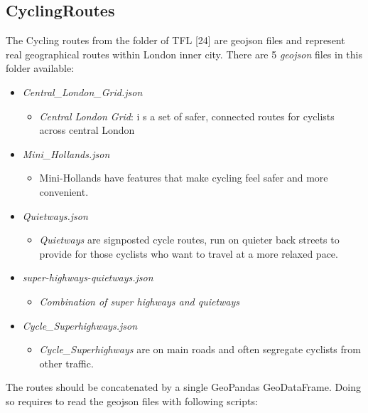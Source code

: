\subsection{CyclingRoutes}
The Cycling routes from the folder of TFL [24] are geojson files and represent real geographical
routes within London inner city.
There are 5 \emph{geojson} files in this folder available:
\begin{itemize}
\item \emph{Central\_London\_Grid.json}
\begin{itemize}
\item \emph{Central London Grid}: i s a set of safer, connected routes for cyclists across central London
\end{itemize}
\item \emph{Mini\_Hollands.json}
\begin{itemize}
\item Mini-Hollands have features that make cycling feel safer and more convenient.
\end{itemize}
\item \emph{Quietways.json}
\begin{itemize}
\item \emph{Quietways} are signposted cycle routes, run on quieter back streets to provide for those cyclists who want to travel at a more relaxed pace.
\end{itemize}
\item \emph{super-highways-quietways.json}
\begin{itemize}
\item \emph{Combination of super highways and quietways}
\end{itemize}
\item \emph{Cycle\_Superhighways.json}
\begin{itemize}
\item \emph{Cycle\_Superhighways} are on main roads and often segregate cyclists from other
traffic.
\end{itemize}
\end{itemize}
The routes should be concatenated by a single GeoPandas GeoDataFrame. Doing so requires to read the
geojson files with following scripts:

